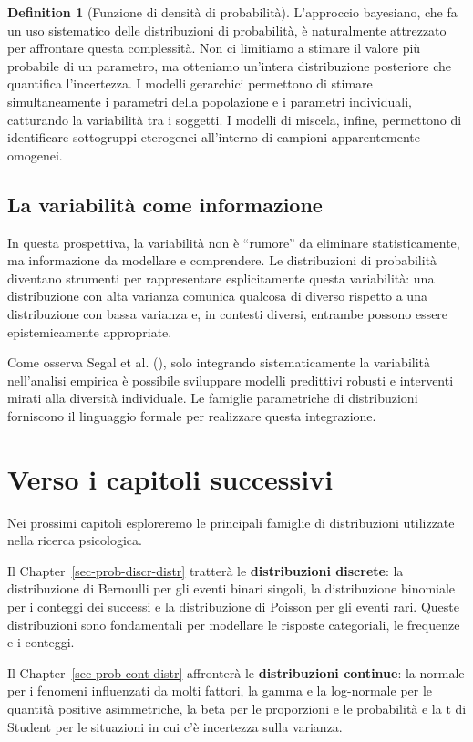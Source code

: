 \documentclass[
  letterpaper,
  DIV=11,
  numbers=noendperiod,
  oneside]{scrreprt}
\theoremstyle{definition}
\theoremstyle{plain}
\theoremstyle{definition}
\newtheorem{definition}{Definition}[chapter]
\theoremstyle{remark}
\begin{document}
\begin{definition}[Funzione di densità di
probabilità]
L'approccio bayesiano, che fa un uso sistematico delle distribuzioni di
probabilità, è naturalmente attrezzato per affrontare questa
complessità. Non ci limitiamo a stimare il valore più probabile di un
parametro, ma otteniamo un'intera distribuzione posteriore che
quantifica l'incertezza. I modelli gerarchici permettono di stimare
simultaneamente i parametri della popolazione e i parametri individuali,
catturando la variabilità tra i soggetti. I modelli di miscela, infine,
permettono di identificare sottogruppi eterogenei all'interno di
campioni apparentemente omogenei.

\subsection{La variabilità come
informazione}\label{la-variabilituxe0-come-informazione}

In questa prospettiva, la variabilità non è ``rumore'' da eliminare
statisticamente, ma informazione da modellare e comprendere. Le
distribuzioni di probabilità diventano strumenti per rappresentare
esplicitamente questa variabilità: una distribuzione con alta varianza
comunica qualcosa di diverso rispetto a una distribuzione con bassa
varianza e, in contesti diversi, entrambe possono essere epistemicamente
appropriate.

Come osserva Segal et al. (),
solo integrando sistematicamente la variabilità nell'analisi empirica è
possibile sviluppare modelli predittivi robusti e interventi mirati alla
diversità individuale. Le famiglie parametriche di distribuzioni
forniscono il linguaggio formale per realizzare questa integrazione.

\section{Verso i capitoli successivi}\label{verso-i-capitoli-successivi}

Nei prossimi capitoli esploreremo le principali famiglie di
distribuzioni utilizzate nella ricerca psicologica.

Il Chapter~\ref{sec-prob-discr-distr} tratterà le \textbf{distribuzioni
discrete}: la distribuzione di Bernoulli per gli eventi binari singoli,
la distribuzione binomiale per i conteggi dei successi e la
distribuzione di Poisson per gli eventi rari. Queste distribuzioni sono
fondamentali per modellare le risposte categoriali, le frequenze e i
conteggi.

Il Chapter~\ref{sec-prob-cont-distr} affronterà le \textbf{distribuzioni
continue}: la normale per i fenomeni influenzati da molti fattori, la
gamma e la log-normale per le quantità positive asimmetriche, la beta
per le proporzioni e le probabilità e la t di Student per le situazioni
in cui c'è incertezza sulla varianza.


\end{definition}
\end{document}
